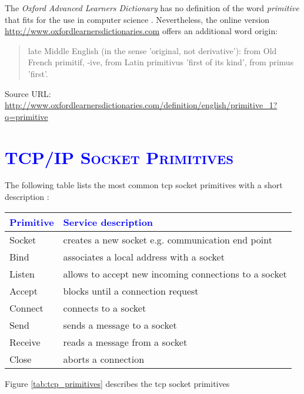\documentclass[xcolor=dvipsnames]{article}
\begin{document}
\noindent The \textit{Oxford Advanced Learners Dictionary} has no definition of the word \textit{primitive} that fits for the use in computer science \cite[p. 1197]{oxford_dictionary}. Nevertheless, the online version \url{http://www.oxfordlearnersdictionaries.com} offers an additional word origin:

\begin{quote}
late Middle English (in the sense 'original, not derivative'): from Old French primitif, -ive, from Latin primitivus 'first of its kind', from primus 'first'.
\end{quote}

\noindent \small{Source URL: \url{http://www.oxfordlearnersdictionaries.com/definition/english/primitive_1?q=primitive}}\\

\noindent 

\section{\scshape{\textcolor{blue}{TCP/IP Socket Primitives}}} \label{socket_primitives}

The following table lists the most common \gls{tcp} socket primitives with a short description \cite{IBM_Anupama}:\\

\begin{center}
\begin{tabular}{ | l | l | } 
\hline
\textcolor{blue}{Primitive} & \textcolor{blue}{Service description}\\
\hline
Socket & creates a new socket e.g. communication end point\\
Bind & associates a local address with a socket\\
Listen & allows to accept new incoming connections to a socket\\
Accept & blocks until a connection request\\
Connect & connects to a socket\\
Send & sends a message to a socket\\
Receive & reads a message from a socket\\
Close & aborts a connection\\
\hline
\end{tabular}
\end{center}
\label{tab:tcp_primitives}

Figure \ref{tab:tcp_primitives} describes the \gls{tcp} socket primitives \cite[p. 142, ch. 4.3.1]{tanenbaum}
\end{document}
